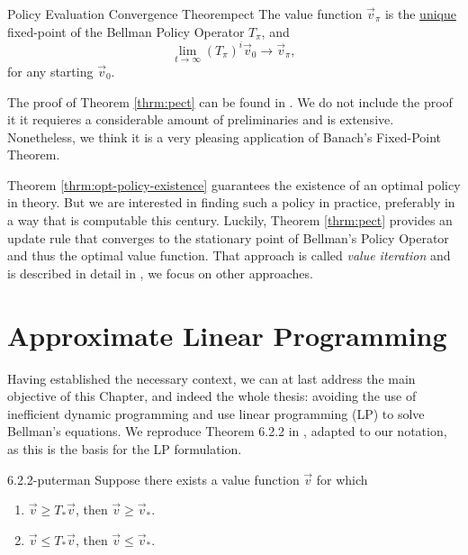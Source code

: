 \begin{thrm}{Policy Evaluation Convergence Theorem}{pect}
    The value function $\vec{v}_\pi$ is the \underline{unique} fixed-point of
    the Bellman Policy Operator $T_\pi$, and
    \[
        \lim_{t \to \infty} (T_\pi)^{i} \vec{v}_0  \to \vec{v}_\pi,
    \]
    for any starting $\vec{v}_0$.
\end{thrm}

The proof of Theorem \ref{thrm:pect} can be found in \cite[pg.~131]{raoRL4F}. We
do not include the proof it it requieres a considerable amount of preliminaries
and is extensive. Nonetheless, we think it is a very pleasing application of
Banach's Fixed-Point Theorem.

Theorem \ref{thrm:opt-policy-existence} guarantees the existence of an optimal
policy in theory. But we are interested in finding such a policy in practice,
preferably in a way that is computable this century. Luckily, Theorem
\ref{thrm:pect} provides an update rule that converges to the stationary point
of Bellman's Policy Operator and thus the optimal value function. That approach
is called \emph{value iteration} and is described in detail in
\cite{SuttonBarto,raoRL4F}, we focus on other approaches.

\section{Approximate Linear Programming}

Having established the necessary context, we can at last address the main
objective of this Chapter, and indeed the whole thesis: avoiding the use of
inefficient dynamic programming and use linear programming (LP) to solve
Bellman's equations. We reproduce Theorem 6.2.2 in
\cite[Ch.~6.9.1]{puterman2014}, adapted to our notation, as this is the basis
for the LP formulation.

\begin{thrm}{}{6.2.2-puterman}
    Suppose there exists a value function $\vec{v}$ for which
    \begin{enumerate}
        \item $\vec{v} \geq T_{*} \vec{v}$, then $\vec{v} \geq \vec{v}_*$.
        \item $\vec{v} \leq T_{*} \vec{v}$, then $\vec{v} \leq \vec{v}_*$.
    \end{enumerate}
\end{thrm}

